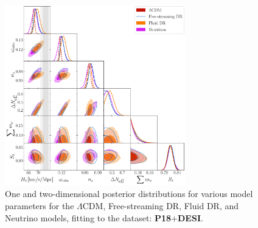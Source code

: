 \documentclass[aps,prd,twocolumn,notitlepage,
superscriptaddress,
nofootinbib,floatfix]{revtex4-2}
\newcommand{\planck}{\textbf{P18}}
\newcommand{\desi}{$\mathbf{+}$\textbf{DESI}}
\begin{document}
\begin{widetext}
\begin{figure}[H]
\centering
    \includegraphics[width=0.7\textwidth]{figures_21_4/all_D.pdf}
    \caption{One and two-dimensional posterior distributions for various model parameters for the $\Lambda$CDM, Free-streaming DR, Fluid DR, and Neutrino models, fitting to the dataset: \planck\desi.}
\end{figure}


\end{widetext}
\end{document}
